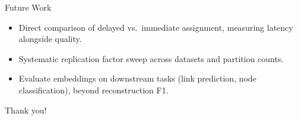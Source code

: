 \documentclass[aspectratio=169]{beamer}
\begin{document}
\begin{frame}{Future Work}
  \begin{itemize}
    \item Direct comparison of delayed vs.\ immediate assignment, measuring latency alongside quality.
    \item Systematic replication factor sweep across datasets and partition counts.
    \item Evaluate embeddings on downstream tasks (link prediction, node classification), beyond reconstruction F1.
  \end{itemize}
\end{frame}

\begin{frame}
  \centering
  \Large Thank you!
\end{frame}
\end{document}
